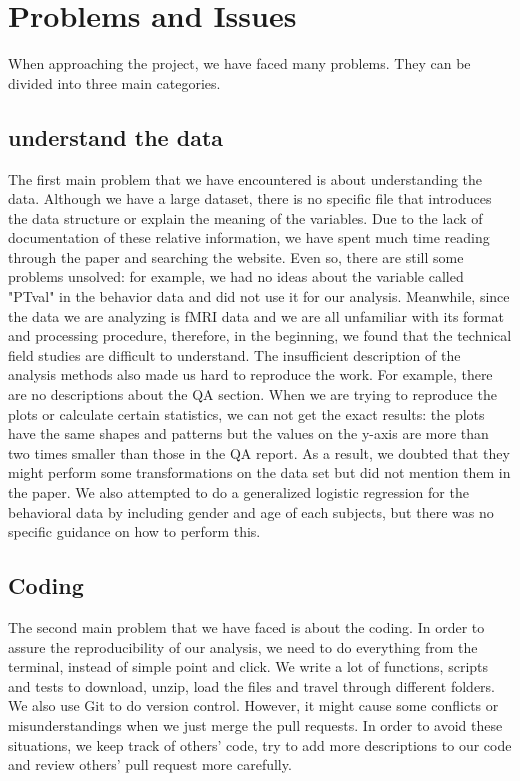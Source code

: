 \section{Problems and Issues}
\noindent
When approaching the project, we have faced many problems. They can be divided 
into three main categories.
\subsection{understand the data}
\noindent
The first main problem that we have encountered is about understanding the 
data. Although we have a large dataset, there is no specific file that 
introduces the data structure or explain the meaning of the variables. Due to 
the lack of documentation of these relative information, we have spent much 
time reading through the paper and searching the website. Even so, there are 
still some problems unsolved: for example, we had no ideas about the variable 
called "PTval" in the behavior data and did not use it for our analysis. 
Meanwhile, since the data we are analyzing is fMRI data and we are all 
unfamiliar with its format and processing procedure, therefore, in the 
beginning, we found that the technical field studies are difficult to 
understand. 
\noindent
The insufficient description of the analysis methods also made us hard to 
reproduce the work. For example,  there are no descriptions about the QA 
section. When we are trying to reproduce the plots or calculate certain 
statistics, we can not get the exact results: the plots have the same shapes 
and patterns but the values on the y-axis are more than two times smaller than 
those in the QA report. As a result, we doubted that they might perform some 
transformations on the data set but did not mention them in the paper. We also 
attempted to do a generalized logistic regression for the behavioral data by 
including gender and age of each subjects, but there was no specific guidance 
on how to perform this.

\subsection{Coding}
\noindent
The second main problem that we have faced is about the coding. In order to 
assure the reproducibility of our analysis, we need to do everything from the 
terminal, instead of simple point and click. We write a lot of functions, 
scripts and tests to download, unzip, load the files and travel through 
different folders.
\noindent
We also use Git to do version control. However, it might cause some conflicts 
or misunderstandings when we just merge the pull requests. In order to avoid 
these situations, we keep track of others’ code, try to add more descriptions 
to our code and review others' pull request more carefully.

